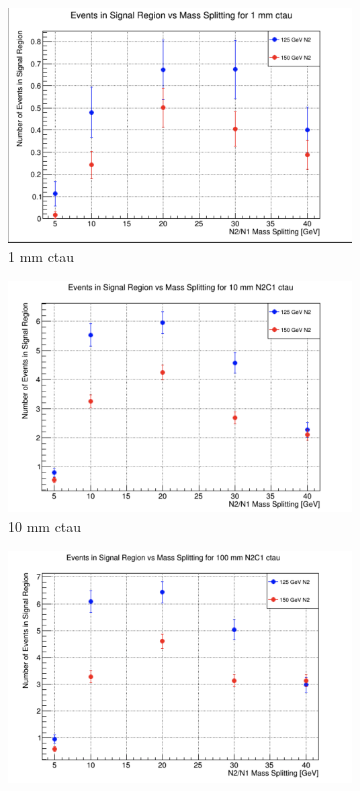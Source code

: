 \documentclass{article}
\begin{document}
\begin{figure} [H]
\begin{subfigure}{.5\textwidth}
  \centering
  \includegraphics[width=.8\linewidth]{1mmWino.png}  
  \caption{1 mm ctau}
  \label{fig:sub-first18}
\end{subfigure}
\begin{subfigure}{.5\textwidth}
  \centering
  \includegraphics[width=.8\linewidth]{10mmWino.png}  
  \caption{10 mm ctau}
  \label{fig:sub-second18}
\end{subfigure}
\begin{subfigure}{.5\textwidth}
  \centering
  \includegraphics[width=.8\linewidth]{100mmWino.png}  

\end{subfigure}
\end{figure}
\end{document}
